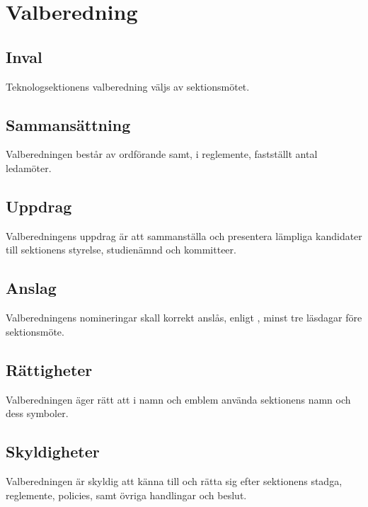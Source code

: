 \section{Valberedning}

\subsection{Inval}
Teknologsektionens valberedning väljs av sektionsmötet.

\subsection{Sammansättning}
Valberedningen består av ordförande samt, i reglemente, fastställt antal ledamöter.

\subsection{Uppdrag}
Valberedningens uppdrag är att sammanställa och presentera lämpliga kandidater
till sektionens styrelse, studienämnd och kommitteer.

\subsection{Anslag}
Valberedningens nomineringar skall korrekt anslås, enligt , minst tre läsdagar före sektionsmöte.

\subsection{Rättigheter}
Valberedningen äger rätt att i namn och emblem använda sektionens namn och dess symboler.

\subsection{Skyldigheter}
Valberedningen är skyldig att känna till och rätta sig efter sektionens stadga, reglemente, policies, samt övriga handlingar och beslut.